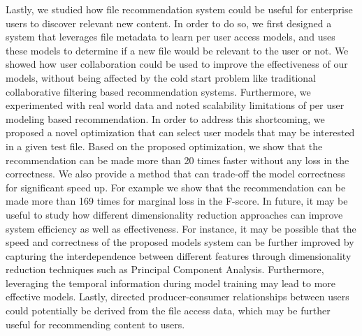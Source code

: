 \documentclass[12pt]{ucsddissertation}
\begin{document}
Lastly, we studied how file recommendation system could be useful for enterprise users to discover relevant new content. In order to do so, we first designed a system that leverages file metadata to learn per user access models, and uses these models to determine if a new file would be relevant to the user or not. We showed how user collaboration could be used to improve the effectiveness of our models, without being affected by the cold start problem like traditional collaborative filtering based recommendation systems. Furthermore, we experimented with real world data and noted scalability limitations of per user modeling based recommendation. In order to address this shortcoming, we proposed a novel optimization that can select user models that may be interested in a given test file. Based on the proposed optimization, we show that the recommendation can be made more than 20 times faster without any loss in the correctness. We also provide a method that can trade-off the model correctness for significant speed up. For example we show that the recommendation can be made more than 169 times for marginal loss in the F-score. In future, it may be useful to study how different dimensionality reduction approaches can improve system efficiency as well as effectiveness. For instance, it may be possible that the speed and correctness of the proposed models system can be further improved by capturing the interdependence between different features through dimensionality reduction techniques such as Principal Component Analysis. Furthermore, leveraging the temporal information during model training may lead to more effective models. Lastly, directed producer-consumer relationships between users could potentially be derived from the file access data, which may be further useful for recommending content to users. 




\backmatter

\end{document}

